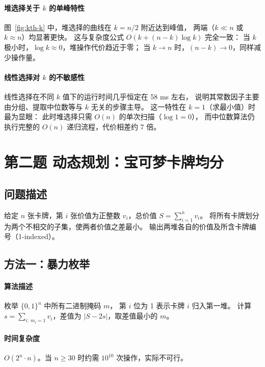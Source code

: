 \documentclass[12pt, a4paper]{ctexart}
\begin{document}
\paragraph{堆选择关于 $k$ 的单峰特性}

图~\ref{fig:kth-k} 中，堆选择的曲线在 $k = n/2$ 附近达到峰值，
两端（$k \ll n$ 或 $k \approx n$）均显著更快。
这与复杂度公式 $O(k + (n-k)\log k)$ 完全一致：
当 $k$ 极小时，$\log k \approx 0$，堆操作代价趋近于零；
当 $k \to n$ 时，$(n-k) \to 0$，同样减少操作量。

\paragraph{线性选择对 $k$ 的不敏感性}

线性选择在不同 $k$ 值下的运行时间几乎恒定在 58 ms 左右，
说明其常数因子主要由分组、提取中位数等与 $k$ 无关的步骤主导。
这一特性在 $k = 1$（求最小值）时最为显眼：
此时堆选择只需 $O(n)$ 的单次扫描（$\log 1 = 0$），
而中位数算法仍执行完整的 $O(n)$ 递归流程，代价相差约 7 倍。

\newpage

\section{第二题 \; 动态规划：宝可梦卡牌均分}

\subsection{问题描述}

给定 $n$ 张卡牌，第 $i$ 张价值为正整数 $v_i$，总价值 $S = \sum_{i=1}^{n} v_i$。
将所有卡牌划分为两个不相交的子集，使两者价值之差最小。
输出两堆各自的价值及所含卡牌编号（1-indexed）。

\subsection{方法一：暴力枚举}

\paragraph{算法描述}
枚举 $\{0,1\}^n$ 中所有二进制掩码 $m$，
第 $i$ 位为 1 表示卡牌 $i$ 归入第一堆。
计算 $s = \sum_{i:\, m_i=1} v_i$，差值为 $|S - 2s|$，取差值最小的 $m$。

\paragraph{时间复杂度} $O(2^n \cdot n)$。当 $n \ge 30$ 时约需 $10^{10}$ 次操作，实际不可行。
\end{document}
